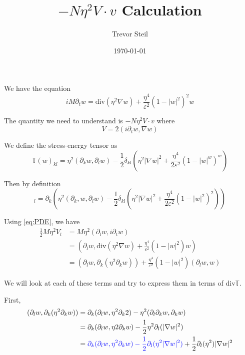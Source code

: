 \documentclass[a4paper]{article}
\title{$-N \eta^2 V \cdot v$ Calculation }
\date{\today}
\author{Trevor Steil}
\renewcommand{\div}{\mathrm{div}}
\begin{document}
\maketitle

We have the equation
\begin{equation}
  i M \partial_t w = \div (\eta^2 \nabla w) + \frac{\eta^4}{\varepsilon^2} (1-|w|^2)^2 w
  \label{eq:PDE}
\end{equation}

The quantity we need to understand is $-N \eta^2 V \cdot v$ where
\begin{equation}
  V = 2 ( i \partial_t w, \nabla w )
  \label{def:V}
\end{equation}

We define the stress-energy tensor as
\begin{equation}
  \mathbb{T}(w)_{kl} = \eta^2 (\partial_k w, \partial_l w) - \frac{1}{2} \delta_{kl} \left( \eta^2 | \nabla w |^2 + \frac{\eta^4}{2 \varepsilon^2}
  (1-|w|^w)^w \right)
  \label{def:T}
\end{equation}

Then by definition
\begin{equation}
  [ \div \mathbb{T}(w) ]_l = \partial_k \left( \eta^2 (\partial_k, w, \partial_l w) - \frac{1}{2} \delta_{kl} \left( \eta^2 |\nabla w|^2 +
  \frac{\eta^4}{2 \varepsilon^2} ( 1- |w|^2 )^2 \right) \right)
  \label{eq:div_T}
\end{equation}

Using \eqref{eq:PDE}, we have
\begin{align}
  \frac{1}{2} M \eta^2 V_l &= M \eta^2 ( \partial_l w, i \partial_t w ) \nonumber \\
  &= \left( \partial_l w, \div ( \eta^2 \nabla w ) + \frac{\eta^4}{\varepsilon^2}( 1 - |w|^2 )w \right) \nonumber \\
  &= ( \partial_l w, \partial_k ( \eta^2 \partial_k w ) ) + \frac{\eta^4}{\varepsilon^2} ( 1 - |w|^2 ) ( \partial_l w, w )
  \label{eq:V_l}
\end{align}

We will look at each of these terms and try to express them in terms of $\div \mathbb{T}$.

First,
\begin{align}
  ( \partial_l w, \partial_k ( \eta^2 \partial_k w ) ) &= \partial_k ( \partial_l w, \eta^2 \partial_k 2) - \eta^2 ( \partial_l \partial_k w,
  \partial_k w ) \nonumber \\
  &= \partial_k ( \partial_l w, \eta2 \partial_k w) - \frac{1}{2} \eta^2 \partial_l ( | \nabla w |^2 ) \nonumber \\
  &= { \color{blue} \partial_k ( \partial_l w, \eta^2 \partial_k w) - \frac{1}{2} \partial_l ( \eta^2 |\nabla w|^2 ) } + \frac{1}{2} \partial_l
  (\eta^2) | \nabla w |^2
  \label{eq:V_l_term1}
\end{align}
\end{document}
